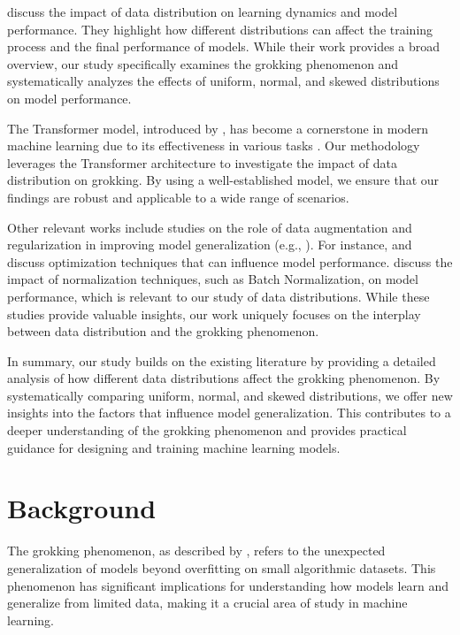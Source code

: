 \documentclass{article} %
\begin{document}
\citet{goodfellow2016deep} discuss the impact of data distribution on learning dynamics and model performance. They highlight how different distributions can affect the training process and the final performance of models. While their work provides a broad overview, our study specifically examines the grokking phenomenon and systematically analyzes the effects of uniform, normal, and skewed distributions on model performance.

The Transformer model, introduced by \citet{vaswani2017attention}, has become a cornerstone in modern machine learning due to its effectiveness in various tasks \cite{Devlin2019BERTPO}. Our methodology leverages the Transformer architecture to investigate the impact of data distribution on grokking. By using a well-established model, we ensure that our findings are robust and applicable to a wide range of scenarios.

Other relevant works include studies on the role of data augmentation and regularization in improving model generalization (e.g., \citet{Shorten2019ASO}). For instance, \citet{kingma2014adam} and \citet{loshchilov2017adamw} discuss optimization techniques that can influence model performance. \citet{Ioffe2015BatchNA} discuss the impact of normalization techniques, such as Batch Normalization, on model performance, which is relevant to our study of data distributions. While these studies provide valuable insights, our work uniquely focuses on the interplay between data distribution and the grokking phenomenon.

In summary, our study builds on the existing literature by providing a detailed analysis of how different data distributions affect the grokking phenomenon. By systematically comparing uniform, normal, and skewed distributions, we offer new insights into the factors that influence model generalization. This contributes to a deeper understanding of the grokking phenomenon and provides practical guidance for designing and training machine learning models.

\section{Background}
\label{sec:background}

The grokking phenomenon, as described by \citet{power2022grokking}, refers to the unexpected generalization of models beyond overfitting on small algorithmic datasets. This phenomenon has significant implications for understanding how models learn and generalize from limited data, making it a crucial area of study in machine learning.
\end{document}
